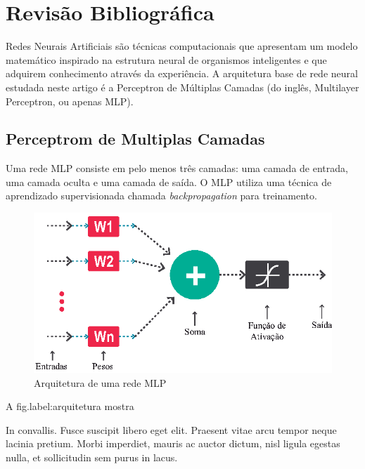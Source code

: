 \section{Revisão Bibliográfica}

Redes Neurais Artificiais são técnicas computacionais que apresentam um modelo matemático inspirado na estrutura neural de organismos inteligentes e que adquirem conhecimento através da experiência. A arquitetura base de rede neural estudada neste artigo é a Perceptron de Múltiplas Camadas (do inglês, Multilayer Perceptron, ou apenas MLP).

\subsection{Perceptrom de Multiplas Camadas}

Uma rede MLP consiste em pelo menos três camadas: uma camada de entrada, uma camada oculta e uma camada de saída. O MLP utiliza uma técnica de aprendizado supervisionada chamada \textit{backpropagation} para treinamento.


\begin{figure}[h!]

\centering %
\includegraphics{04-Figuras/Arquitetura}

\caption{Arquitetura de uma rede MLP}

\label{figura:arquitetura}

\end{figure}

A fig.{label:arquitetura} mostra

In convallis. Fusce suscipit libero eget elit. Praesent vitae arcu tempor neque lacinia pretium. Morbi imperdiet, mauris ac auctor dictum, nisl ligula egestas nulla, et sollicitudin sem purus in lacus.



